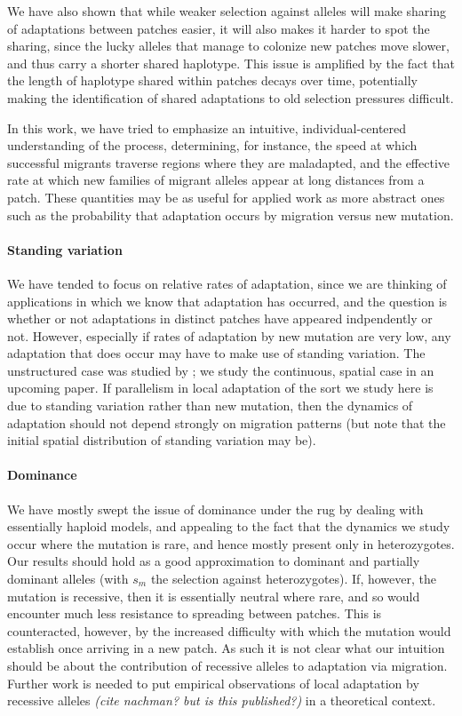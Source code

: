 \documentclass{article}
\newcommand{\plr}[1]{{\it\color{blue}(#1)}}
\begin{document}
We have also shown that
while weaker selection against alleles will make sharing 
of adaptations between patches easier, 
it will also makes it harder to spot the sharing,
since the lucky alleles that manage to colonize new patches move slower,
and thus carry a shorter shared haplotype.
This issue is amplified by the fact that the length of haplotype
shared within patches decays over time, potentially making the
identification of shared adaptations to old selection pressures difficult.

In this work, we have tried to emphasize an intuitive, individual-centered understanding of the process,
determining, for instance, 
the speed at which successful migrants traverse regions where they are maladapted,
and the effective rate at which new families of migrant alleles appear
at long distances from a patch.
These quantities may be as useful for applied work
as more abstract ones such as the probability that adaptation occurs by migration versus new mutation.


\paragraph{Standing variation} 
We have tended to focus on relative rates of adaptation,
since we are thinking of applications in which we know that adaptation has occurred,
and the question is whether or not adaptations in distinct patches
have appeared indpendently or not.
However, especially if rates of adaptation by new mutation are very low,
any adaptation that does occur may have to make use of standing variation.
The unstructured case was studied by \citet{softsweepsI};
we study the continuous, spatial case in an upcoming paper.
If parallelism in local adaptation of the sort we study here is due to standing variation
rather than new mutation,
then the dynamics of adaptation should not depend strongly on migration patterns
(but note that the initial spatial distribution of standing variation may be).

\paragraph{Dominance}
We have mostly swept the issue of dominance under the rug
by dealing with essentially haploid models,
and appealing to the fact that the dynamics we study occur where the mutation is rare,
and hence mostly present only in heterozygotes. 
Our results should hold as a good approximation to dominant and partially dominant alleles
(with $s_m$ the selection against heterozygotes).
If, however, the mutation is recessive, then it is essentially neutral where rare,
and so would encounter much less resistance to spreading between patches.
This is counteracted, however, by the increased difficulty with which the mutation would establish
once arriving in a new patch. 
As such it is not clear what our intuition should be 
about the contribution of recessive alleles to adaptation via migration. 
Further work is needed to put empirical observations of local adaptation by recessive alleles 
\plr{cite nachman? but is this published?}
in a theoretical context.
\end{document}
